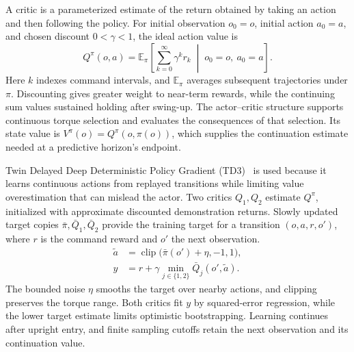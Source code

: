 \documentclass[letterpaper,10pt,conference]{ieeeconf}
\begin{document}
A critic is a parameterized estimate of the return obtained by taking an action and then following the policy. For initial observation $o_0=o$, initial action $a_0=a$, and chosen discount $0<\gamma<1$, the ideal action value is
\begin{equation}
 Q^\pi(o,a)=\mathbb E_\pi\!\left[
 \sum_{k=0}^{\infty}\gamma^k r_k
 \;\middle|\;o_0=o,\ a_0=a
 \right].
\label{eq:policy-value}
\end{equation}
Here $k$ indexes command intervals, and $\mathbb E_\pi$ averages subsequent trajectories under $\pi$. Discounting gives greater weight to near-term rewards, while the continuing sum values sustained holding after swing-up. The actor--critic structure supports continuous torque selection and evaluates the consequences of that selection. Its state value is $V^\pi(o)=Q^\pi(o,\pi(o))$, which supplies the continuation estimate needed at a predictive horizon's endpoint.

Twin Delayed Deep Deterministic Policy Gradient (TD3)~\cite{fujimoto2018} is used because it learns continuous actions from replayed transitions while limiting value overestimation that can mislead the actor. Two critics $Q_1,Q_2$ estimate $Q^\pi$, initialized with approximate discounted demonstration returns. Slowly updated target copies $\bar\pi,\bar Q_1,\bar Q_2$ provide the training target for a transition $(o,a,r,o')$, where $r$ is the command reward and $o'$ the next observation.
\begin{equation}
\begin{aligned}
 \widetilde a&=\operatorname{clip}\bigl(\bar\pi(o')+\eta,-1,1\bigr),\\
 y&=r+\gamma\min_{j\in\{1,2\}}\bar Q_j(o',\widetilde a).
\end{aligned}
\label{eq:td-target}
\end{equation}
The bounded noise $\eta$ smooths the target over nearby actions, and clipping preserves the torque range. Both critics fit $y$ by squared-error regression, while the lower target estimate limits optimistic bootstrapping. Learning continues after upright entry, and finite sampling cutoffs retain the next observation and its continuation value.
\end{document}
